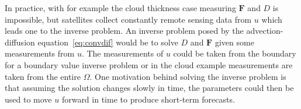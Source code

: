 In practice, with for example the cloud thickness case measuring $\mathbf{F}$ and $D$ is impossible, but satellites collect constantly remote sensing data from $u$ which leads one to the inverse problem.
An inverse problem posed by the advection-diffusion equation~\eqref{eq:convdif} would be to solve $D$ and $\mathbf{F}$ given some measurements from $u$.
The measurements of $u$ could be taken from the boundary for a boundary value inverse problem or in the cloud example measurements are taken from the entire $\Omega$.
One motivation behind solving the inverse problem is that assuming the solution changes slowly in time, the parameters could then be used to move $u$ forward in time to produce short-term forecasts.

